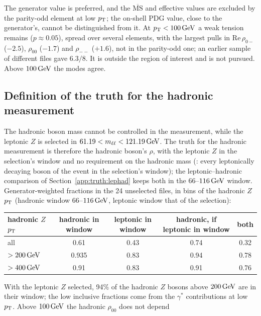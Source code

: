 The generator value is preferred, and the $\overline{\mathrm{MS}}$ and effective values are excluded by the parity-odd
element at low $p_{\mathrm{T}}$; the on-shell PDG value, close to the generator's, cannot be distinguished from it.
At $p_{\mathrm{T}} < 100\,\mathrm{GeV}$ a weak tension remains ($p \approx 0.05$), spread over several elements, with the largest pulls in
$\mathrm{Re}\,\rho_{0-}$ ($-2.5$), $\rho_{00}$ ($-1.7$) and $\rho_{--}$ ($+1.6$), not in the
parity-odd one; an earlier sample of different files gave $6.3/8$. It is outside the region of interest and is not
pursued. Above $100\,\mathrm{GeV}$ the modes agree.

\subsection{Definition of the truth for the hadronic measurement}
\label{app:truth:definition}
The hadronic boson mass cannot be controlled in the measurement, while the leptonic $Z$ is selected in
$61.19 < m_{\ell\ell} < 121.19\,\mathrm{GeV}$. The truth for the hadronic measurement is therefore the hadronic boson's $\rho$,
with the leptonic $Z$ in the selection's window and no requirement on the hadronic mass (: every leptonically decaying boson of the event in the selection's window); the leptonic--hadronic
comparison of Section~\ref{app:truth:lephad} keeps both in the $66$--$116\,\mathrm{GeV}$ window. Generator-weighted
fractions in the 24 unselected  files, in bins of the hadronic $Z$ $p_{\mathrm{T}}$ (hadronic window
$66$--$116\,\mathrm{GeV}$, leptonic window that of the selection):
\begin{center}
\small
\begin{tabular}{lcccc}
\toprule
hadronic $Z$ $p_{\mathrm{T}}$ & hadronic in window & leptonic in window & hadronic, if leptonic in window & both \\
\midrule
all & 0.61 & 0.43 & 0.74 & 0.32 \\
$> 200\,\mathrm{GeV}$ & 0.935 & 0.83 & 0.94 & 0.78 \\
$> 400\,\mathrm{GeV}$ & 0.91 & 0.83 & 0.91 & 0.76 \\
\bottomrule
\end{tabular}
\end{center}
With the leptonic $Z$ selected, 94\% of the hadronic $Z$ bosons above $200\,\mathrm{GeV}$ are in their window; the low inclusive
fractions come from the $\gamma^*$ contributions at low $p_{\mathrm{T}}$. Above $100\,\mathrm{GeV}$ the hadronic $\rho_{00}$ does not depend
